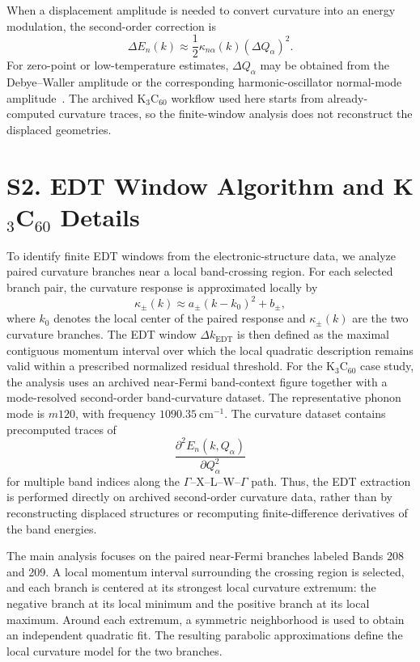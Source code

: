 \documentclass[12pt]{article}
\begin{document}
When a displacement amplitude is needed to convert curvature into an energy
modulation, the second-order correction is
\begin{equation}
\Delta E_n(k)
\approx
\frac{1}{2}\kappa_{n\alpha}(k)(\Delta Q_\alpha)^2 .
\end{equation}
For zero-point or low-temperature estimates, $\Delta Q_\alpha$ may be obtained
from the Debye--Waller amplitude or the corresponding harmonic-oscillator
normal-mode amplitude~\cite{Ziman1972,AshcroftMermin}. The archived K$_3$C$_{60}$
workflow used here starts from already-computed curvature traces, so the
finite-window analysis does not reconstruct the displaced geometries.

\section*{S2. EDT Window Algorithm and K$_3$C$_{60}$ Details}

To identify finite EDT windows from the electronic-structure data, we analyze paired curvature branches near a local band-crossing region. For each selected branch pair, the curvature response is approximated locally by
\begin{equation}
\kappa_\pm(k)\approx a_\pm(k-k_0)^2+b_\pm ,
\end{equation}
where \(k_0\) denotes the local center of the paired response and \(\kappa_\pm(k)\) are the two curvature branches. The EDT window \(\Delta k_{\mathrm{EDT}}\) is then defined as the maximal contiguous momentum interval over which the local quadratic description remains valid within a prescribed normalized residual threshold. For the K$_3$C$_{60}$ case study, the analysis uses an archived near-Fermi band-context figure together with a mode-resolved second-order band-curvature dataset. The representative phonon mode is \(m120\), with frequency \(1090.35~\mathrm{cm}^{-1}\). The curvature dataset contains precomputed traces of
\[
\frac{\partial^2 E_n(k,Q_\alpha)}{\partial Q_\alpha^2}
\]
for multiple band indices along the \(\Gamma\)--X--L--W--\(\Gamma\) path. Thus, the EDT extraction is performed directly on archived second-order curvature data, rather than by reconstructing displaced structures or recomputing finite-difference derivatives of the band energies.

The main analysis focuses on the paired near-Fermi branches labeled Bands 208 and 209. A local momentum interval surrounding the crossing region is selected, and each branch is centered at its strongest local curvature extremum: the negative branch at its local minimum and the positive branch at its local maximum. Around each extremum, a symmetric neighborhood is used to obtain an independent quadratic fit. The resulting parabolic approximations define the local curvature model for the two branches.
\end{document}
